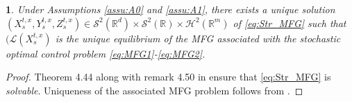 \documentclass[12,english]{amsart}
\theoremstyle{plain}
\theoremstyle{definition}
\theoremstyle{plain}
\theoremstyle{plain}
\newtheorem{prop}[thm]{\protect\propositionname}
\theoremstyle{remark}
\providecommand{\propositionname}{Proposition}
\newcommand{\R}{\mathbb R}
\newcommand{\cH}{\mathcal H}
\newcommand{\cL}{\mathcal L}
\newcommand{\cS}{\mathcal S}
\begin{document}
\begin{prop}
\label{prop:Exist}Under Assumptions \ref{assu:A0} and \ref{assu:A1},
there exists a unique solution
$(X^{t,x}_s,Y^{t,x}_s,Z^{t,x}_s)\in\cS^2(\R^d)\times\cS^2(\R)\times\cH^2(\R^m)$ 
of \eqref{eq:Str_MFG} such that $(\cL(X^{t,x}_s)$
is the unique equilibrium of the MFG associated with the stochastic
optimal control problem \eqref{eq:MFG1}-\eqref{eq:MFG2}. 
\end{prop}

\begin{proof}
Theorem 4.44 along with remark 4.50 in \cite{carmona2018probabilistic}
ensure that \eqref{eq:Str_MFG} is {\em solvable}. Uniqueness of the
associated MFG problem follows from \cite[Theorem 3.29]{carmona2018probabilistic}.
\end{proof}
\end{document}
